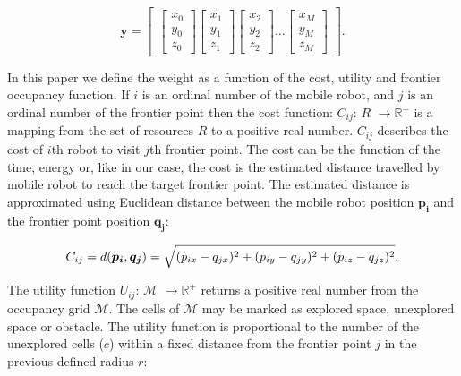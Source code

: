 \documentclass[letterpaper, 10 pt, conference]{ieeeconf}  %
\begin{document}
\begin{equation}
   \boldsymbol{y}=\begin{bmatrix}
   \begin{bmatrix}
           x_{0} \\
           y_{0} \\
           z_{0}
   \end{bmatrix}
    \begin{bmatrix}
         x_{1} \\
         y_{1} \\
         z_{1}
    \end{bmatrix}
    \begin{bmatrix}
         x_{2} \\
         y_{2} \\
         z_{2}
    \end{bmatrix}
    \hdots
    \begin{bmatrix}
         x_{M} \\
         y_{M} \\
         z_{M}
    \end{bmatrix}
\end{bmatrix}.
\end{equation}

In this paper we define the weight as a function of the cost, utility and frontier occupancy function. If $i$ is an ordinal number of the mobile robot, and $j$ is an ordinal number of the frontier point then the cost function: $C_{ij}$: $R$ \(\rightarrow \text{$\mathbb{R}^{+}$}\) is a mapping from the set of resources $R$ to a positive real number. $C_{ij}$ describes the cost of $i$th robot to visit $j$th frontier point. The cost can be the function of the time,  energy or, like in our case, the cost is the estimated distance travelled by mobile robot to reach the target frontier point. The estimated distance is approximated using Euclidean distance between the mobile robot position $\boldsymbol{p_{i}}$ and the frontier point position $\boldsymbol{q_{j}}$:

\begin{equation}\small
    C_{ij}=d(\boldsymbol{p_{i}}, \boldsymbol{q_{j}}) = \sqrt{(p_{ix}-q_{jx})^{2}+(p_{iy}-q_{jy})^{2}+(p_{iz}-q_{jz})^{2}}.
    \label{cost}
\end{equation}

The utility function $U_{ij}$:  \(\text{$\mathcal {M}$}\) \(\rightarrow \text{$\mathbb{R}^{+}$}\) returns a positive real number from the occupancy grid \(\text{$\mathcal {M}$}\). The cells of \(\text{$\mathcal {M}$}\) may be marked as explored space, unexplored space or obstacle. The utility function is proportional to the number of the unexplored cells ($c$) within a fixed distance from the frontier point $j$ in the previous defined radius $r$: 
\end{document}
